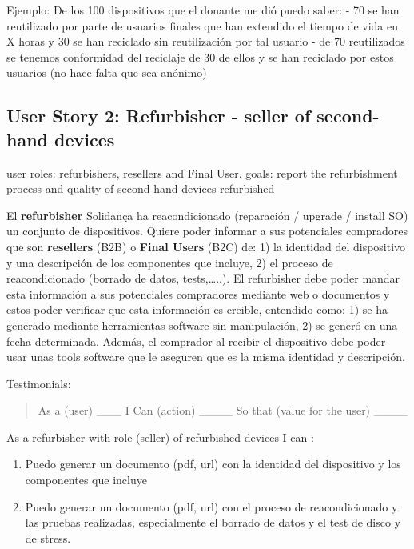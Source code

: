 \documentclass[
]{book}
\begin{document}
Ejemplo: De los 100 dispositivos que el donante me dió puedo saber:
- 70 se han reutilizado por parte de usuarios finales que han extendido el tiempo de vida en X horas y 30 se han reciclado sin reutilización por tal usuario
- de 70 reutilizados se tenemos conformidad del reciclaje de 30 de ellos y se han reciclado por estos usuarios (no hace falta que sea anónimo)

\hypertarget{user-story-2-refurbisher---seller-of-second-hand-devices}{%
\subsection{User Story 2: Refurbisher - seller of second-hand devices}\label{user-story-2-refurbisher---seller-of-second-hand-devices}}

user roles: refurbishers, resellers and Final User.
goals: report the refurbishment process and quality of second hand devices refurbished

El \textbf{refurbisher} Solidança ha reacondicionado (reparación / upgrade / install SO) un conjunto de dispositivos. Quiere poder informar a sus potenciales compradores que son \textbf{resellers} (B2B) o \textbf{Final Users} (B2C) de: 1) la identidad del dispositivo y una descripción de los componentes que incluye, 2) el proceso de reacondicionado (borrado de datos, tests,\ldots..). El refurbisher debe poder mandar esta información a sus potenciales compradores mediante web o documentos y estos poder verificar que esta información es creible, entendido como: 1) se ha generado mediante herramientas software sin manipulación, 2) se generó en una fecha determinada. Además, el comprador al recibir el dispositivo debe poder usar unas tools software que le aseguren que es la misma identidad y descripción.

Testimonials:

\begin{quote}
As a (user) \_\_\_ I Can (action) \_\_\_\_ So that (value for the user) \_\_\_\_
\end{quote}

As a refurbisher with role (seller) of refurbished devices I can :

\begin{enumerate}
\def\labelenumi{\arabic{enumi}.}
\item
  Puedo generar un documento (pdf, url) con la identidad del dispositivo y los componentes que incluye
\item
  Puedo generar un documento (pdf, url) con el proceso de reacondicionado y las pruebas realizadas, especialmente el borrado de datos y el test de disco y de stress.
\end{enumerate}
\end{document}
